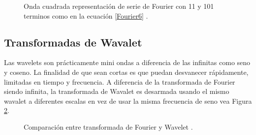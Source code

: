 \begin{figure}[h]
  \centering
  \centering
  \caption{Onda cuadrada representación de serie de Fourier con 11 y 101 terminos como en la ecuación \ref{Fourier6} \cite{FourierBook}.}
  \label{fFourier}
\end{figure}


\subsection{Transformadas de Wavalet} \cite{extra10}\cite{extra11}
Las wavelets son prácticamente mini ondas a diferencia de las infinitas como seno y coseno. La finalidad de que sean cortas es que puedan desvanecer rápidamente, limitadas en tiempo y frecuencia. A diferencia de la transformada de Fourier siendo infinita, la transformada de Wavalet es desarmada usando el mismo wavalet a diferentes escalas en vez de usar la misma frecuencia de seno vea Figura \ref{fWvsF}.

\begin{figure}[h]
  \centering
  \centering
  \caption{Comparación entre transformada de Fourier y Wavelet \cite{WaveVsFourier}.}
  \label{fWvsF}
\end{figure}

